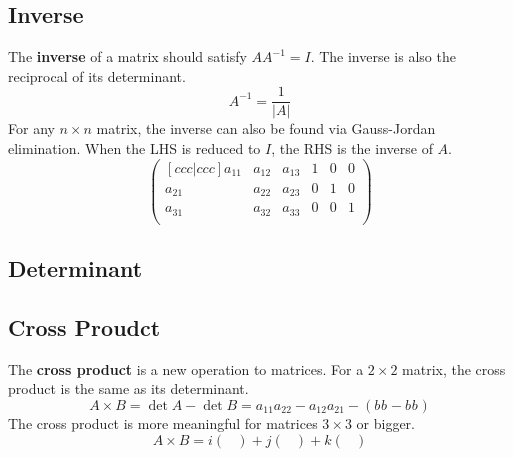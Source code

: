 \documentclass[10pt,a4paper,fleqn]{article} %
\begin{document}
\subsection{Inverse} %
The \textbf{inverse} of a matrix should satisfy $AA^{-1}=I$. The inverse is also the reciprocal of its determinant.
\begin{equation}
    A^{-1} = \frac{1}{|A|}
\end{equation}
For any $n\times n$ matrix, the inverse can also be found via Gauss-Jordan elimination.
When the LHS is reduced to $I$, the RHS is the inverse of $A$.
\begin{equation}
    \begin{pmatrix}[ccc|ccc]
        a_{11} & a_{12} & a_{13} & 1 & 0 & 0 \\
        a_{21} & a_{22} & a_{23} & 0 & 1 & 0 \\
        a_{31} & a_{32} & a_{33} & 0 & 0 & 1 \\
    \end{pmatrix}
\end{equation}

\subsection{Determinant} %


\subsection{Cross Proudct} %
The \textbf{cross product} is a new operation to matrices. For a $2\times2$ matrix,
the cross product is the same as its determinant.
\begin{equation}
    A \times B
    =
    \det{A} - \det{B}
    =
    a_{11} a_{22} - a_{12} a_{21} - \left( b_{} b_{} - b_{} b_{} \right)
\end{equation}
The cross product is more meaningful for matrices $3\times3$ or bigger.
\begin{equation}
    A \times B
    =
    i \begin{pmatrix}
        
    \end{pmatrix}
    +
    j \begin{pmatrix}
        
    \end{pmatrix}
    +
    k \begin{pmatrix}
        
    \end{pmatrix}
\end{equation}
\end{document}
